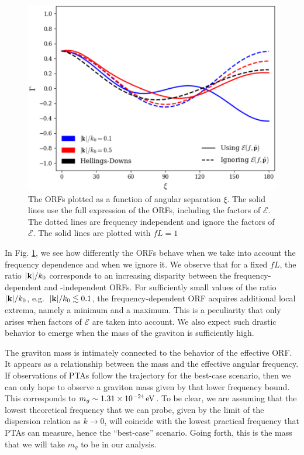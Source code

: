 \documentclass[prd,twocolumn,aps,psfig,nofootinbib,nobibnotes,superscriptaddress,preprintnumbers,times]{revtex4-2}
\newcommand{\eV}{\,{\rm eV}}
\begin{document}
\begin{figure}[ht]
    \centering
    \includegraphics[scale=0.48]{fig1.pdf}
    \caption{The ORFs plotted as a function of angular separation $\xi$. The solid lines use the full expression of the ORFs, including the factors of $\mathcal{E}$. The dotted lines are frequency independent and ignore the factors of $\mathcal{E}$. The solid lines are plotted with $fL = 1$}
    \label{fig:orfs}
\end{figure}
In Fig. \ref{fig:orfs}, we see how differently the ORFs behave when we take into account the frequency dependence and when we ignore it. We observe that for a fixed $fL$, the ratio $|{\bf k}|/k_0$ corresponds to an increasing disparity between the frequency-dependent and -independent ORFs. For sufficiently small values of the ratio $|{\bf k}|/k_0$, e.g.\ $|{\bf k}|/k_0 \lesssim 0.1$, the frequency-dependent ORF acquires additional local extrema, namely a minimum and a maximum. This is a peculiarity that only arises when factors of $\mathcal{E}$ are taken into account. We also expect such drastic behavior to emerge when the mass of the graviton is sufficiently high.

The graviton mass is intimately connected to the behavior of the effective ORF. It appears as a relationship between the mass and the effective angular frequency. 
If observations of PTAs follow the trajectory for the best-case scenario, then we can only hope to observe a graviton mass given by that lower frequency bound. This corresponds to $m_g \sim 1.31\times 10^{-24} \eV$. To be clear, we are assuming that the lowest theoretical frequency that we can probe, given by the limit of the dispersion relation as $k\rightarrow 0$, will coincide with the lowest practical frequency that PTAs can measure, hence the ``best-case'' scenario. Going forth, this is the mass that we will take $m_g$ to be in our analysis.
\end{document}
